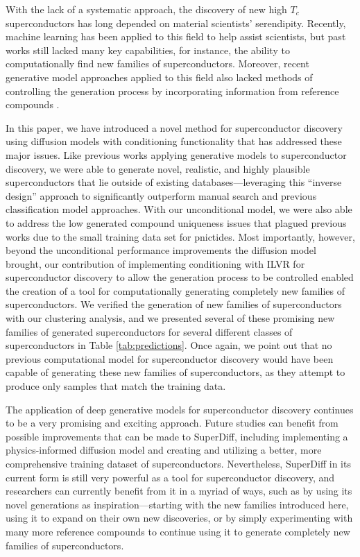 \documentclass[%
reprint,
 amsmath,amssymb,
 aps,
prb,
]{revtex4-2}
\begin{document}
With the lack of a systematic approach, the discovery of new high $T_c$ superconductors has long depended on material scientists' serendipity. Recently, machine learning has been applied to this field to help assist scientists, but past works still lacked many key capabilities, for instance, the ability to computationally find new families of superconductors. Moreover, recent generative model approaches applied to this field also lacked methods of controlling the generation process by incorporating information from reference compounds \cite{Kim_2024, wines2023cdvae, zhongdiffsupercon}. 

In this paper, we have introduced a novel method for superconductor discovery using diffusion models with conditioning functionality that has addressed these major issues. Like previous works applying generative models to superconductor discovery, we were able to generate novel, realistic, and highly plausible superconductors that lie outside of existing databases---leveraging this ``inverse design'' approach to significantly outperform manual search and previous classification model approaches. With our unconditional model, we were also able to address the low generated compound uniqueness issues that plagued previous works due to the small training data set for pnictides. Most importantly, however, beyond the unconditional performance improvements the diffusion model brought, our contribution of implementing conditioning with ILVR for superconductor discovery to allow the generation process to be controlled enabled the creation of a tool for computationally generating completely new families of superconductors. We verified the generation of new families of superconductors with our clustering analysis, and we presented several of these promising new families of generated superconductors for several different classes of superconductors in Table \ref{tab:predictions}. Once again, we point out that no previous computational model for superconductor discovery would have been capable of generating these new families of superconductors, as they attempt to produce only samples that match the training data.

The application of deep generative models for superconductor discovery continues to be a very promising and exciting approach. Future studies can benefit from possible improvements that can be made to SuperDiff, including implementing a physics-informed diffusion model and creating and utilizing a better, more comprehensive training dataset of superconductors. Nevertheless, SuperDiff in its current form is still very powerful as a tool for superconductor discovery, and researchers can currently benefit from it in a myriad of ways, such as by using its novel generations as inspiration---starting with the new families introduced here, using it to expand on their own new discoveries, or by simply experimenting with many more reference compounds to continue using it to generate completely new families of superconductors.



\end{document}
